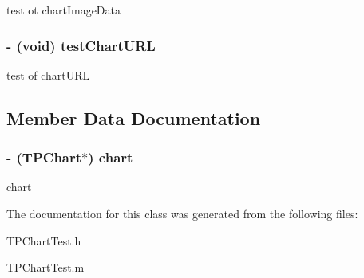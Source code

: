 test ot chartImageData \hypertarget{interface_t_p_chart_test_2fe38433a4c1dd976e0e599da48593e6}{
\subsubsection[{testChartURL}]{\setlength{\rightskip}{0pt plus 5cm}- (void) testChartURL }}
\label{interface_t_p_chart_test_2fe38433a4c1dd976e0e599da48593e6}


test of chartURL 

\subsection{Member Data Documentation}
\hypertarget{interface_t_p_chart_test_fef5f839997d4ce5f3847a8224f5625d}{
\subsubsection[{chart}]{\setlength{\rightskip}{0pt plus 5cm}- ({\bf TPChart}$\ast$) {\bf chart}}}
\label{interface_t_p_chart_test_fef5f839997d4ce5f3847a8224f5625d}


chart 

The documentation for this class was generated from the following files:\begin{CompactItemize}
\item 
TPChartTest.h\item 
TPChartTest.m\end{CompactItemize}
